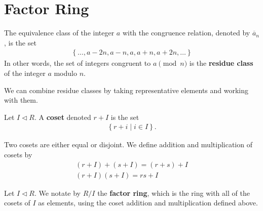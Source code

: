 \documentclass{memoir}
\begin{document}
\section{Factor Ring}
\begin{defn}
The equivalence class of the integer \(a\) with the congruence relation, denoted by \(\overline{a}_n\), is the set
\begin{align*}
	\left\{ \ldots,a-2n,a-n,a,a+n,a+2n,\ldots \right\} 
\end{align*}
In other words, the set of integers congruent to \(a \pmod n\) is the \textbf{residue class} of the integer \(a\) modulo \(n\). 
\end{defn}
We can combine residue classes by taking representative elements and working with them.

\begin{defn}[Coset]
	Let \(I \triangleleft R	\). A \textbf{coset} denoted \(r + I\) is the set
	\begin{align*}
	\left\{r+i \mid i \in I \right\} .
	\end{align*}
\end{defn}
Two cosets are either equal or disjoint. We define addition and multiplication of cosets by
\begin{align*}
	(r+I) + (s+I) = (r+s) + I \\
	(r+I)(s+I) = rs + I
\end{align*}
\begin{defn}
	Let \(I \triangleleft R\). We notate by \(R / I\) the \textbf{factor ring}, which is the ring with all of the cosets of \(I\) as elements, using the coset addition and multiplication defined above.
\end{defn}
\end{document}
